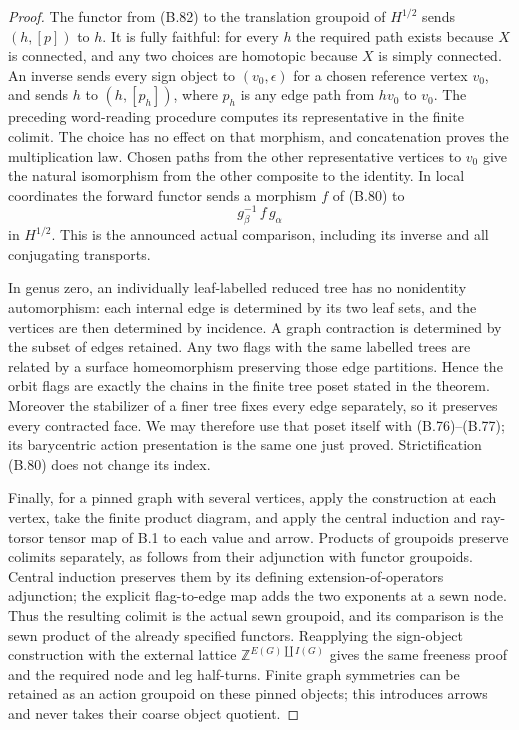 \begin{proof}
The functor from (B.82) to the translation groupoid of
$H^{1/2}$ sends $(h,[p])$ to $h$.  It is fully faithful:
for every $h$ the required path exists because $X$
is connected, and any two choices are homotopic because
$X$ is simply connected.  An inverse sends every sign
object to $(v_0,\epsilon)$ for a chosen reference vertex
$v_0$, and sends $h$ to $(h,[p_h])$, where $p_h$ is
any edge path from $hv_0$ to $v_0$.  The preceding
word-reading procedure computes its representative in
the finite colimit.  The choice has no effect on that
morphism, and concatenation proves the multiplication
law.  Chosen paths from the other representative
vertices to $v_0$ give the natural isomorphism from
the other composite to the identity.  In local
coordinates the forward functor sends a morphism
$f$ of (B.80) to
\[
 g_\beta^{-1}\,f\,g_\alpha
\]
in $H^{1/2}$.  This is the announced actual comparison,
including its inverse and all conjugating transports.

In genus zero, an individually leaf-labelled reduced
tree has no nonidentity automorphism: each internal
edge is determined by its two leaf sets, and the
vertices are then determined by incidence.  A graph
contraction is determined by the subset of edges retained.
Any two flags with the same labelled trees are related
by a surface homeomorphism preserving those edge
partitions.  Hence the orbit flags are exactly the
chains in the finite tree poset stated in the theorem.
Moreover the stabilizer of a finer tree fixes every
edge separately, so it preserves every contracted face.
We may therefore use that poset itself with (B.76)--(B.77);
its barycentric action presentation is the same one
just proved.  Strictification (B.80) does not change
its index.

Finally, for a pinned graph with several vertices,
apply the construction at each vertex, take the finite
product diagram, and apply the central induction and
ray-torsor tensor map of B.1 to each value and arrow.
Products of groupoids preserve colimits separately,
as follows from their adjunction with functor groupoids.
Central induction preserves them by its defining
extension-of-operators adjunction; the explicit
flag-to-edge map adds the two exponents at a sewn node.
Thus the resulting colimit is the actual sewn groupoid,
and its comparison is the sewn product of the already
specified functors.  Reapplying the sign-object
construction with the external lattice
$\mathbb Z^{E(G)\amalg I(G)}$ gives the same freeness
proof and the required node and leg half-turns.
Finite graph symmetries can be retained as an action
groupoid on these pinned objects; this introduces
arrows and never takes their coarse object quotient.
\end{proof}
